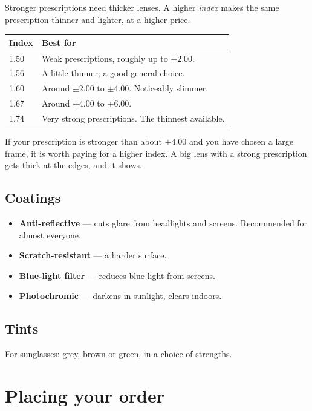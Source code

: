 \documentclass[11pt,a4paper]{report}
\begin{document}
Stronger prescriptions need thicker lenses. A higher \emph{index} makes
the same prescription thinner and lighter, at a higher price.

\begin{longtable}{@{}p{}p{}@{}}
\toprule
\textbf{Index} & \textbf{Best for} \\
\midrule
\endhead
1.50 & Weak prescriptions, roughly up to $\pm 2.00$. \\
1.56 & A little thinner; a good general choice. \\
1.60 & Around $\pm 2.00$ to $\pm 4.00$. Noticeably slimmer. \\
1.67 & Around $\pm 4.00$ to $\pm 6.00$. \\
1.74 & Very strong prescriptions. The thinnest available. \\
\bottomrule
\end{longtable}

\begin{tipbox}
If your prescription is stronger than about $\pm 4.00$ and you have
chosen a large frame, it is worth paying for a higher index. A big lens
with a strong prescription gets thick at the edges, and it shows.
\end{tipbox}

\section{Coatings}

\begin{itemize}
  \item \textbf{Anti-reflective} --- cuts glare from headlights and
        screens. Recommended for almost everyone.
  \item \textbf{Scratch-resistant} --- a harder surface.
  \item \textbf{Blue-light filter} --- reduces blue light from screens.
  \item \textbf{Photochromic} --- darkens in sunlight, clears indoors.
\end{itemize}

\section{Tints}

For sunglasses: grey, brown or green, in a choice of strengths.

\chapter{Placing your order}
\end{document}
